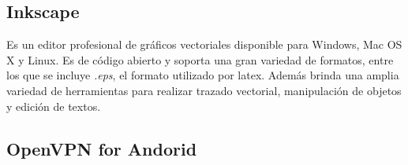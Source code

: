 \documentclass[12pt]{article}
\begin{document}
    \subsection{Inkscape}
        Es un editor profesional de gráficos vectoriales disponible para Windows, Mac OS X y Linux. Es de código abierto y soporta una gran variedad de formatos, entre los que se incluye \textit{.eps}, el formato utilizado por latex. Además brinda una amplia variedad de herramientas para realizar trazado vectorial, manipulación de objetos y edición de textos.

    \subsection{OpenVPN for Andorid}



\end{document}
